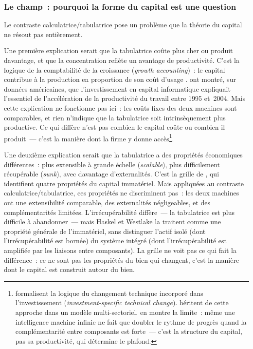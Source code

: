\subsubsection{Le champ~: pourquoi la forme du capital est une question}

Le contraste calculatrice/tabulatrice pose un problème que la théorie du capital ne résout pas entièrement.

\markNEO
Une première explication serait que la tabulatrice coûte plus cher ou produit davantage, et que la concentration reflète un avantage de productivité. C'est la logique de la comptabilité de la croissance (\emph{growth accounting})~: le capital contribue à la production en proportion de son coût d'usage \parencite{solow_contribution_1956,jorgenson_retrospective_2008}. \textcite{oliner_resurgence_2000,oliner_explaining_2007} ont montré, sur données américaines, que l'investissement en capital informatique expliquait l'essentiel de l'accélération de la productivité du travail entre 1995 et~2004. Mais cette explication ne fonctionne pas ici~: les coûts fixes des deux machines sont comparables, et rien n'indique que la tabulatrice soit intrinsèquement plus productive. Ce qui diffère n'est pas combien le capital coûte ou combien il produit~--- c'est la manière dont la firme y donne accès\footnote{\textcite{greenwood_long_1997} formalisent la logique du changement technique incorporé dans l'investissement (\emph{investment-specific technical change}). \textcite{falck_digital_2024} héritent de cette approche dans un modèle multi-sectoriel. \textcite{jones_ai_rd_2025} en montre la limite~: même une intelligence machine infinie ne fait que doubler le rythme de progrès quand la complémentarité entre composants est forte~--- c'est la structure du capital, pas sa productivité, qui détermine le plafond.}.

Une deuxième explication serait que la tabulatrice a des propriétés économiques différentes~: plus extensible à grande échelle (\emph{scalable}), plus difficilement récupérable (\emph{sunk}), avec davantage d'externalités. C'est la grille de \textcite{haskel_capitalism_2018}, qui identifient quatre propriétés du capital immatériel. Mais appliquées au contraste calculatrice/tabulatrice, ces propriétés ne discriminent pas~: les deux machines ont une extensibilité comparable, des externalités négligeables, et des complémentarités limitées. L'irrécupérabilité diffère~--- la tabulatrice est plus difficile à abandonner~--- mais Haskel et Westlake la traitent comme une propriété générale de l'immatériel, sans distinguer l'actif isolé (dont l'irrécupérabilité est bornée) du système intégré (dont l'irrécupérabilité est amplifiée par les liaisons entre composants). La grille ne voit pas ce qui fait la différence~: ce ne sont pas les propriétés du bien qui changent, c'est la manière dont le capital est construit autour du bien.

